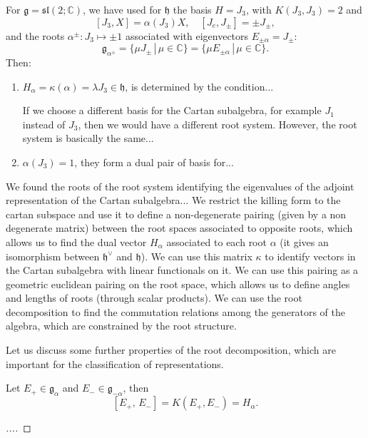 For \(\mathfrak{g} = \mathfrak{sl}(2; \mathbb{C})\), we have used for \(\mathfrak{h}\) the basis \(H = J_3\), with \(K(J_3, J_3) = 2\) and
\[
    [J_3, X] = \alpha(J_3) X, \quad [J_e, J_\pm] = \pm J_\pm,
\]
and the roots \(\alpha^{\pm} : J_3 \mapsto \pm 1\) associated with eigenvectors \(E_{\pm\alpha} = J_{\pm}\):
\[
    \mathfrak{g}_{\alpha^{\pm}} = \{ \mu J_{\pm} \,|\, \mu \in \mathbb{C} \} = \{ \mu E_{\pm\alpha} \,|\, \mu \in \mathbb{C} \}.
\]
Then:
\begin{enumerate}
    \item \(H_{\alpha} = \kappa(\alpha) = \lambda J_3 \in \mathfrak{h}\), is determined by the condition...

          If we choose a different basis for the Cartan subalgebra, for example \(J_1\) instead of \(J_3\), then we would have a different root system. However, the root system is basically the same...
    \item \(\alpha(J_3)=1\), they form a dual pair of basis for...
\end{enumerate}

We found the roots of the root system identifying the eigenvalues of the adjoint representation of the Cartan subalgebra...
We restrict the killing form to the cartan subspace and use it to define a non-degenerate pairing (given by a non degenerate matrix) between the root spaces associated to opposite roots, which allows us to find the dual vector \(H_{\alpha}\) associated to each root \(\alpha\) (it gives an isomorphism between \(\mathfrak{h}^\vee\) and \(\mathfrak{h}\)). We can use this matrix \(\kappa\) to identify vectors in the Cartan subalgebra with linear functionals on it. We can use this pairing as a geometric euclidean pairing on the root space, which allows us to define angles and lengths of roots (through scalar products). We can use the root decomposition to find the commutation relations among the generators of the algebra, which are constrained by the root structure.

Let us discuss some further properties of the root decomposition, which are important for the classification of representations.

\begin{lemma}
    Let \(E_+ \in \mathfrak{g}_{\alpha}\) and \(E_- \in \mathfrak{g}_{-\alpha}\), then
    \[
        [E_+ ,\, E_-] = K(E_+,E_-) = H_{\alpha}.
    \]
\end{lemma}
\begin{proof}
    [...]
\end{proof}

